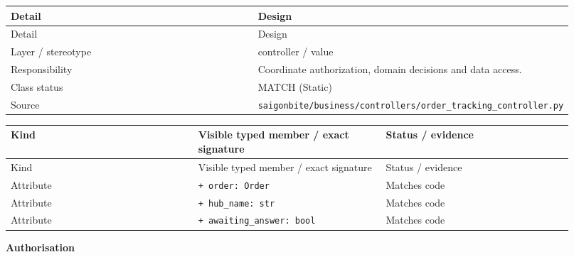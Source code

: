 \begin{longtable}{>{\raggedright\arraybackslash}p{0.4600\linewidth}>{\raggedright\arraybackslash}p{0.4600\linewidth}}
Detail & Design \\
\hline\endfirsthead
Detail & Design \\
\hline\endhead
Layer / stereotype & controller / \guillemotleft{}value\guillemotright{} \\
Responsibility & Coordinate authorization, domain decisions and data access. \\
Class status & MATCH (Static) \\
Source & \texttt{saigonbite/\allowbreak{}business/\allowbreak{}controllers/\allowbreak{}order\_\allowbreak{}tracking\_\allowbreak{}controller.\allowbreak{}py} \\
\end{longtable}
\begin{longtable}{>{\raggedright\arraybackslash}p{0.3067\linewidth}>{\raggedright\arraybackslash}p{0.3067\linewidth}>{\raggedright\arraybackslash}p{0.3067\linewidth}}
Kind & Visible typed member / exact signature & Status / evidence \\
\hline\endfirsthead
Kind & Visible typed member / exact signature & Status / evidence \\
\hline\endhead
Attribute & \texttt{+ order: Order} & Matches code \\
Attribute & \texttt{+ hub\_\allowbreak{}name: str} & Matches code \\
Attribute & \texttt{+ awaiting\_\allowbreak{}answer: bool} & Matches code \\
\end{longtable}
\textbf{Authorisation}

